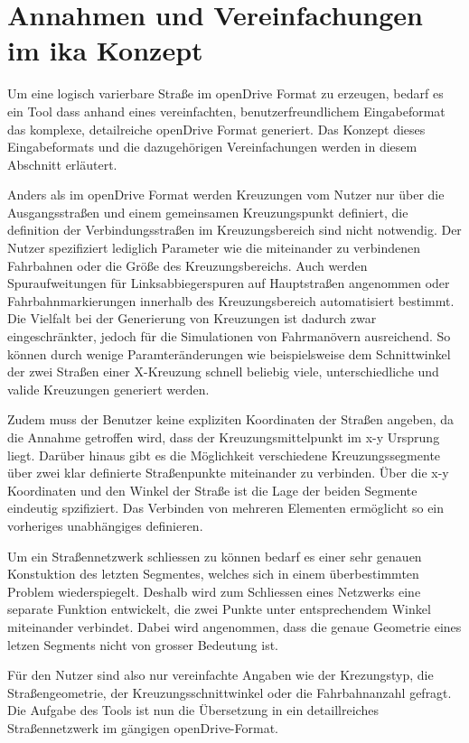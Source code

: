 \chapter{Annahmen und Vereinfachungen im ika Konzept}

Um eine logisch varierbare Straße im openDrive Format zu erzeugen, bedarf es ein Tool dass anhand eines vereinfachten, benutzerfreundlichem Eingabeformat das komplexe, detailreiche openDrive Format generiert. Das Konzept dieses Eingabeformats und die dazugehörigen Vereinfachungen werden in diesem Abschnitt erläutert.

Anders als im openDrive Format werden Kreuzungen vom Nutzer nur über die Ausgangsstraßen und einem gemeinsamen Kreuzungspunkt definiert, die definition der Verbindungsstraßen im Kreuzungsbereich sind nicht notwendig. Der Nutzer spezifiziert lediglich Parameter wie die miteinander zu verbindenen Fahrbahnen oder die Größe des Kreuzungsbereichs. Auch werden Spuraufweitungen für Linksabbiegerspuren auf Hauptstraßen angenommen oder Fahrbahnmarkierungen innerhalb des Kreuzungsbereich automatisiert bestimmt. Die Vielfalt bei der Generierung von Kreuzungen ist dadurch zwar eingeschränkter, jedoch für die Simulationen von Fahrmanövern ausreichend. So können durch wenige Paramteränderungen wie beispielsweise dem Schnittwinkel der zwei Straßen einer X-Kreuzung schnell beliebig viele, unterschiedliche und valide Kreuzungen generiert werden. 

Zudem muss der Benutzer keine expliziten Koordinaten der Straßen angeben, da die Annahme getroffen wird, dass der Kreuzungsmittelpunkt im x-y Ursprung liegt. Darüber hinaus gibt es die Möglichkeit verschiedene Kreuzungssegmente über zwei klar definierte Straßenpunkte miteinander zu verbinden. Über die x-y Koordinaten und den Winkel der Straße ist die Lage der beiden Segmente eindeutig spzifiziert. Das Verbinden von mehreren Elementen ermöglicht so ein vorheriges unabhängiges definieren. 

Um ein Straßennetzwerk schliessen zu können bedarf es einer sehr genauen Konstuktion des letzten Segmentes, welches sich in einem überbestimmten Problem wiederspiegelt. Deshalb wird zum Schliessen eines Netzwerks eine separate Funktion entwickelt, die zwei Punkte unter entsprechendem Winkel miteinander verbindet. Dabei wird angenommen, dass die genaue Geometrie eines letzen Segments nicht von grosser Bedeutung ist.

Für den Nutzer sind also nur vereinfachte Angaben wie der Krezungstyp, die Straßengeometrie, der Kreuzungsschnittwinkel oder die Fahrbahnanzahl gefragt. Die Aufgabe des Tools ist nun die Übersetzung in ein detaillreiches Straßennetzwerk im gängigen openDrive-Format.

